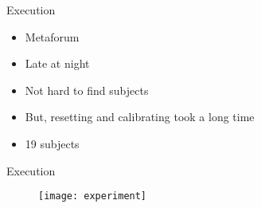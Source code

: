 \begin{frame}{Execution}
	\begin{itemize}
		\item Metaforum
		\item Late at night 
		\item Not hard to find subjects 
		\item But, resetting and calibrating took a long time 
		\item 19 subjects
	\end{itemize}
\end{frame}

\begin{frame}{Execution}
	\begin{figure}
		\texttt{[image: experiment]}
	\end{figure}
\end{frame}
